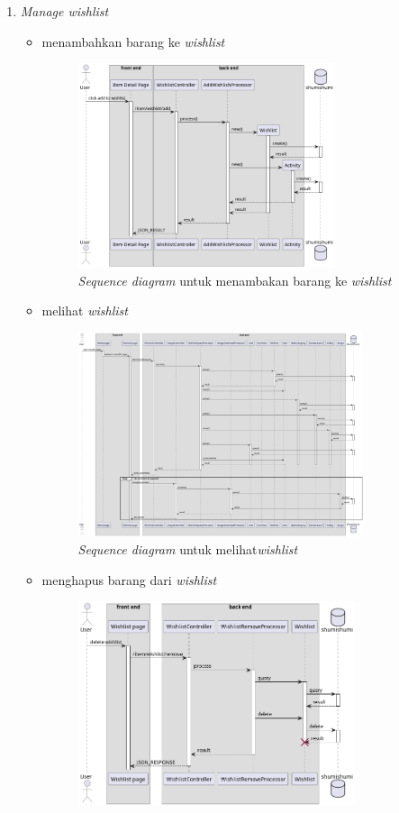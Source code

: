 \documentclass[a4paper]{article}
\begin{document}
\begin{enumerate}
\begin{enumerate}
        \item \textit{Manage wishlist}
        \begin{itemize}
            \item menambahkan barang ke \textit{wishlist}
            \begin{figure}[h]
                \centering
                \includegraphics*[height=6cm]{./diagram/sequence diagram/12. wishlist/add to wishlist/add to wishlist.png}
                \caption{\textit{Sequence diagram} untuk menambakan barang ke \textit{wishlist}}
            \end{figure}
            \newpage
            \item melihat \textit{wishlist}
            \begin{figure}[h]
                \centering
                \includegraphics*[height=6cm]{./diagram/sequence diagram/12. wishlist/query wishlist/query wishlist.png}
                \caption{\textit{Sequence diagram} untuk melihat\textit{wishlist}}
            \end{figure}
            \item menghapus barang dari \textit{wishlist}
            \begin{figure}[h]
                \centering
                \includegraphics*[height=6cm]{./diagram/sequence diagram/12. wishlist/remove from wishlist/remove from wishlist.png}

\end{figure}
\end{itemize}
\end{enumerate}
\end{enumerate}
\end{document}
